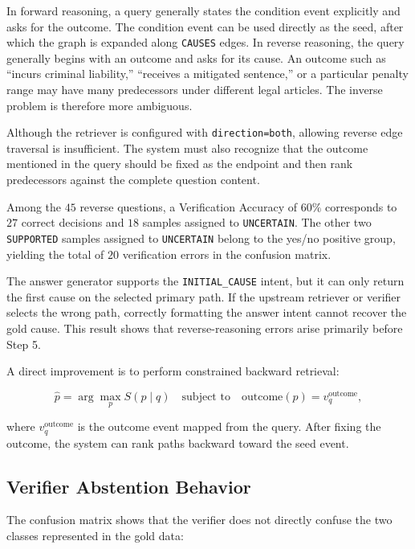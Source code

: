 In forward reasoning, a query generally states the condition event explicitly
and asks for the outcome. The condition event can be used directly as the
seed, after which the graph is expanded along \texttt{CAUSES} edges. In
reverse reasoning, the query generally begins with an outcome and asks for
its cause. An outcome such as ``incurs criminal liability,'' ``receives a
mitigated sentence,'' or a particular penalty range may have many
predecessors under different legal articles. The inverse problem is
therefore more ambiguous.

Although the retriever is configured with \texttt{direction=both}, allowing
reverse edge traversal is insufficient. The system must also recognize that
the outcome mentioned in the query should be fixed as the endpoint and then
rank predecessors against the complete question content.

Among the \(45\) reverse questions, a Verification Accuracy of \(60\%\)
corresponds to \(27\) correct decisions and \(18\) samples assigned to
\texttt{UNCERTAIN}. The other two \texttt{SUPPORTED} samples assigned to
\texttt{UNCERTAIN} belong to the yes/no positive group, yielding the total
of \(20\) verification errors in the confusion matrix.

The answer generator supports the \texttt{INITIAL\_CAUSE} intent, but it can
only return the first cause on the selected primary path. If the upstream
retriever or verifier selects the wrong path, correctly formatting the
answer intent cannot recover the gold cause. This result shows that
reverse-reasoning errors arise primarily before Step 5.

A direct improvement is to perform constrained backward retrieval:

\begin{equation}
\widehat{p}
=
\arg\max_{p}
S(p \mid q)
\quad
\text{subject to}
\quad
\mathrm{outcome}(p)
=
v_q^{\mathrm{outcome}},
\end{equation}

where \(v_q^{\mathrm{outcome}}\) is the outcome event mapped from the query.
After fixing the outcome, the system can rank paths backward toward the seed
event.

\subsection{Verifier Abstention Behavior}

The confusion matrix shows that the verifier does not directly confuse the
two classes represented in the gold data:

